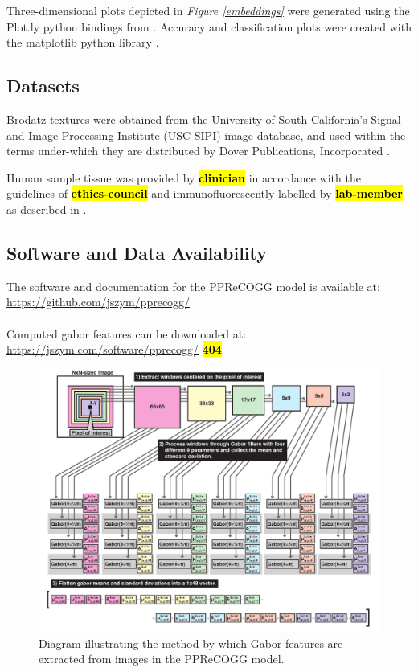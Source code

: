Three-dimensional plots depicted in \textit{Figure \ref{embeddings}} were generated using the Plot.ly python bindings from \cite{plotly}. Accuracy and classification plots were created with the \mbox{matplotlib} python library \citep{hunter2007}.\par

\subsection{Datasets}
Brodatz textures were obtained from the University of South California's Signal and Image Processing Institute (USC-SIPI) image database, and used within the terms under-which they are distributed by Dover Publications, Incorporated \citep{brodatz1999}.\par

Human sample tissue was provided by \hl{\textbf{clinician}} in accordance with the guidelines of \hl{\textbf{ethics-council}} and immunofluorescently labelled by \hl{\textbf{lab-member}} as described in \citep{halaoui2017}.\par

\subsection{Software and Data Availability}

The software and documentation for the PPReCOGG model is available at:\\ \url{https://github.com/jszym/pprecogg/}
\\\\
Computed gabor features can be downloaded at:\\ 
\url{https://jszym.com/software/pprecogg/}  \hl{\textbf{404}}

\begin{landscape}
	\begin{figure}[ht!]
		\centering
		\includegraphics[width=190mm]{figures/gabor-kmknn-figure2.pdf}
		\caption{Diagram illustrating the method by which Gabor features are extracted from images in the PPReCOGG model. \label{gabor_diagram}}
	\end{figure}
\end{landscape}

